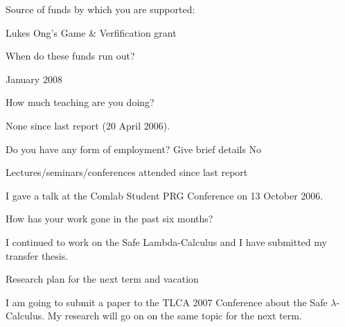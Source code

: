 \documentclass{article}
\def\answ#1{#1 \vspace{0.5em}}
\newcounter{SQcount}
\newenvironment{subq}{
\begin{list}
    {} %
    {   \usecounter{SQcount}
        \renewcommand{\makelabel}[1]{\stepcounter{SQcount} \textbf{\alph{SQcount}) \parbox[t]{0.8\linewidth}{{##1}}}  }
        \setlength{\rightmargin}{\leftmargin}
    }
}
{\end{list}}
\begin{document}
\begin{list}
\item[]
\begin{subq}
\item[Source of funds by which you are supported:] \

    \answ{Lukes Ong's Game \& Verfification grant }

\item[When do these funds run out?] \

   \answ{January 2008}

\end{subq}

\item[How much teaching are you doing?] \

\answ{None since last report (20 April 2006).}

\item[Do you have any form of employment? Give brief details]
\answ{No}

\item[Lectures/seminars/conferences attended since last report] \

\answ{I gave a talk at the Comlab Student PRG Conference on 13 October 2006.}

\item[How has your work gone in the past six months?] \

\answ{ I continued to work on the Safe Lambda-Calculus and I have submitted my transfer thesis.}

\item[Research plan for the next term and vacation] \

I am going to submit a paper to the TLCA 2007 Conference about the Safe $\lambda$-Calculus.
My research will go on on the same topic for the next term.


\end{list}



\end{document}
